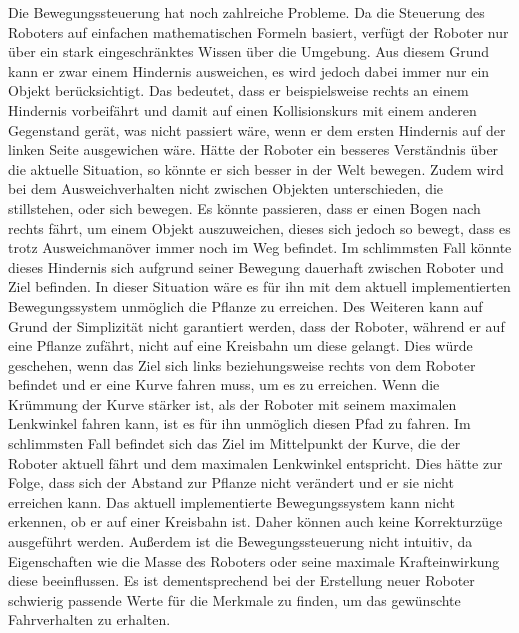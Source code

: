 Die Bewegungssteuerung hat noch zahlreiche Probleme. Da die Steuerung des Roboters auf einfachen mathematischen Formeln basiert, verfügt der Roboter nur über ein stark eingeschränktes Wissen über die Umgebung. Aus diesem Grund kann er zwar einem Hindernis ausweichen, es wird jedoch dabei immer nur ein Objekt berücksichtigt. Das bedeutet, dass er beispielsweise rechts an einem Hindernis vorbeifährt und damit auf einen Kollisionskurs mit einem anderen Gegenstand gerät, was nicht passiert wäre, wenn er dem ersten Hindernis auf der linken Seite ausgewichen wäre. Hätte der Roboter ein besseres Verständnis über die aktuelle Situation, so könnte er sich besser in der Welt bewegen. Zudem wird bei dem Ausweichverhalten nicht zwischen Objekten unterschieden, die stillstehen, oder sich bewegen. Es könnte passieren, dass er einen Bogen nach rechts fährt, um einem Objekt auszuweichen, dieses sich jedoch so bewegt, dass es trotz Ausweichmanöver immer noch im Weg befindet. Im schlimmsten Fall könnte dieses Hindernis sich aufgrund seiner Bewegung dauerhaft zwischen Roboter und Ziel befinden. In dieser Situation wäre es für ihn mit dem aktuell implementierten Bewegungssystem unmöglich die Pflanze zu erreichen.
Des Weiteren kann auf Grund der Simplizität nicht garantiert werden, dass der Roboter, während er auf eine Pflanze zufährt, nicht auf eine Kreisbahn um diese gelangt. Dies würde geschehen, wenn das Ziel sich links beziehungsweise rechts von dem Roboter befindet und er eine Kurve fahren muss, um es zu erreichen. Wenn die Krümmung der Kurve stärker ist, als der Roboter mit seinem maximalen Lenkwinkel fahren kann, ist es für ihn unmöglich diesen Pfad zu fahren. Im schlimmsten Fall befindet sich das Ziel im Mittelpunkt der Kurve, die der Roboter aktuell fährt und dem maximalen Lenkwinkel entspricht. Dies hätte zur Folge, dass sich der Abstand zur Pflanze nicht verändert und er sie nicht erreichen kann. Das aktuell implementierte Bewegungssystem kann nicht erkennen, ob er auf einer Kreisbahn ist. Daher können auch keine Korrekturzüge ausgeführt werden.
Außerdem ist die Bewegungssteuerung nicht intuitiv, da Eigenschaften wie die Masse des Roboters oder seine maximale Krafteinwirkung diese beeinflussen. Es ist dementsprechend bei der Erstellung neuer Roboter schwierig passende Werte für die Merkmale zu finden, um das gewünschte Fahrverhalten zu erhalten.

